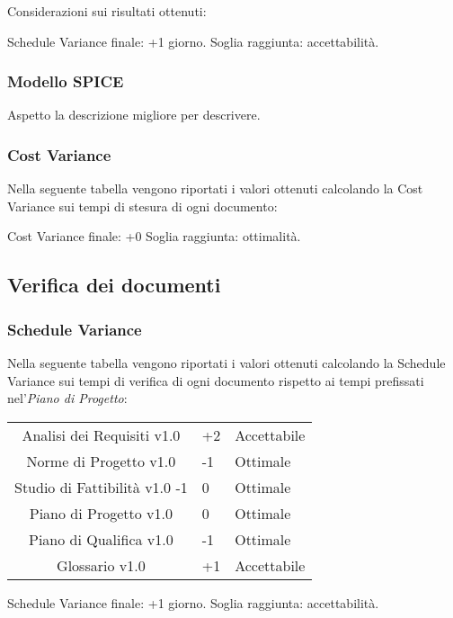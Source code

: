 Considerazioni sui risultati ottenuti:

Schedule Variance finale: +1 giorno.
Soglia raggiunta: accettabilità.

\subsubsection{Modello SPICE}
Aspetto la descrizione migliore per descrivere.

\subsubsection{Cost Variance}
Nella seguente tabella vengono riportati i valori ottenuti calcolando la Cost Variance sui tempi di stesura di ogni documento:


Cost Variance finale: +0%
Soglia raggiunta: ottimalità.

\subsection{Verifica dei documenti}
\subsubsection{Schedule Variance}
Nella seguente tabella vengono riportati i valori ottenuti calcolando la Schedule Variance sui tempi di verifica di ogni documento rispetto ai tempi prefissati nel'\textit{Piano di Progetto}:

{
	\centering
	\begin{tabular}{| c | R{0.5cm} | C{3cm} |}
		\hline
		Analisi dei Requisiti v1.0 & +2 & Accettabile \\
		Norme di Progetto v1.0 & -1 & Ottimale \\
		Studio di Fattibilità v1.0 -1 &  0 &  Ottimale \\
		Piano di Progetto v1.0 &  0 &  Ottimale\\
		Piano di Qualifica v1.0 & -1 & Ottimale \\
		Glossario v1.0 & +1 & Accettabile\\	
		\hline
	\end{tabular}

}


Schedule Variance finale: +1 giorno.
Soglia raggiunta: accettabilità.

